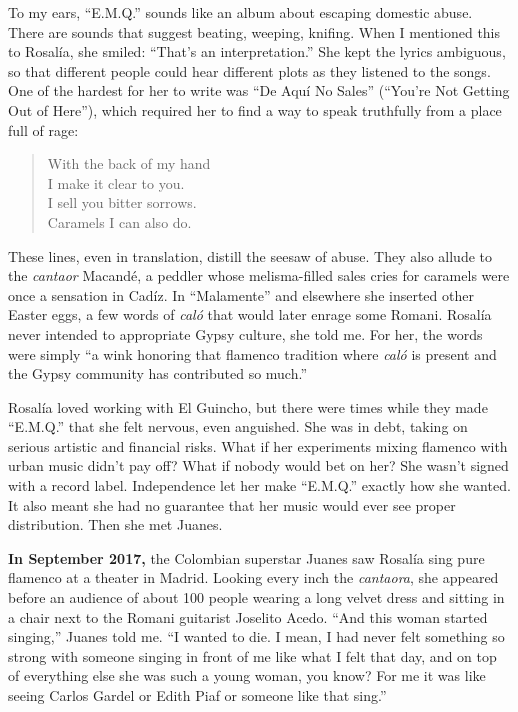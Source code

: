 To my ears, ``E.M.Q.'' sounds like an album about escaping domestic
abuse. There are sounds that suggest beating, weeping, knifing. When I
mentioned this to Rosalía, she smiled: ``That's an interpretation.'' She
kept the lyrics ambiguous, so that different people could hear different
plots as they listened to the songs. One of the hardest for her to write
was ``De Aquí No Sales'' (``You're Not Getting Out of Here''), which
required her to find a way to speak truthfully from a place full of
rage:

\begin{quote}
With the back of my hand\\
I make it clear to you.\\
I sell you bitter sorrows.\\
Caramels I can also do.
\end{quote}

These lines, even in translation, distill the seesaw of abuse. They also
allude to the \emph{cantaor} Macandé, a peddler whose melisma-filled
sales cries for caramels were once a sensation in Cadíz. In
``Malamente'' and elsewhere she inserted other Easter eggs, a few words
of \emph{caló} that would later enrage some Romani. Rosalía never
intended to appropriate Gypsy culture, she told me. For her, the words
were simply ``a wink honoring that flamenco tradition where \emph{caló}
is present and the Gypsy community has contributed so much.''

Rosalía loved working with El Guincho, but there were times while they
made ``E.M.Q.'' that she felt nervous, even anguished. She was in debt,
taking on serious artistic and financial risks. What if her experiments
mixing flamenco with urban music didn't pay off? What if nobody would
bet on her? She wasn't signed with a record label. Independence let her
make ``E.M.Q.'' exactly how she wanted. It also meant she had no
guarantee that her music would ever see proper distribution. Then she
met Juanes.

\textbf{In September 2017,} the Colombian superstar Juanes saw Rosalía
sing pure flamenco at a theater in Madrid. Looking every inch the
\emph{cantaora}, she appeared before an audience of about 100 people
wearing a long velvet dress and sitting in a chair next to the Romani
guitarist Joselito Acedo. ``And this woman started singing,'' Juanes
told me. ``I wanted to die. I mean, I had never felt something so strong
with someone singing in front of me like what I felt that day, and on
top of everything else she was such a young woman, you know? For me it
was like seeing Carlos Gardel or Edith Piaf or someone like that sing.''

